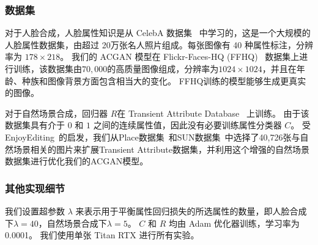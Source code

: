 \subsubsection{数据集}
对于人脸合成，人脸属性知识是从 CelebA 数据集~\cite{celeba} 中学习的，这是一个大规模的人脸属性数据集，由超过 20万张名人照片组成。每张图像有 40 种属性标注，分辨率为 $178\times218$。 我们的 ACGAN 模型在 Flickr-Faces-HQ (FFHQ)~\cite{stylegan} 数据集上进行训练，该数据集由$70,000$的高质量图像组成，分辨率为$1024\times1024$，并且在年龄、种族和图像背景方面包含相当大的变化。 FFHQ训练的模型能够生成更真实的图像。

对于自然场景合成，回归器 $R$在 Transient Attribute Database~\cite{scenedataset} 上训练。 由于该数据集具有介于 $0$ 和 $1$ 之间的连续属性值，因此没有必要训练属性分类器 $C$。 受EnjoyEditing~\cite{iclr2021}的启发，我们从Place数据集~\cite{place}和SUN数据集~\cite{sun}中选择了40,726张与自然场景相关的图片来扩展Transient Attribute数据集，并利用这个增强的自然场景数据集进行优化我们的ACGAN模型。


\subsubsection{其他实现细节}
我们设置超参数 $\lambda$ 来表示用于平衡属性回归损失的所选属性的数量，即人脸合成下$\lambda=40$，自然场景合成下$\lambda=5$。 $C$ 和 $R$ 均由 Adam 优化器训练，学习率为 0.0001。 我们使用单张 Titan RTX 进行所有实验。

